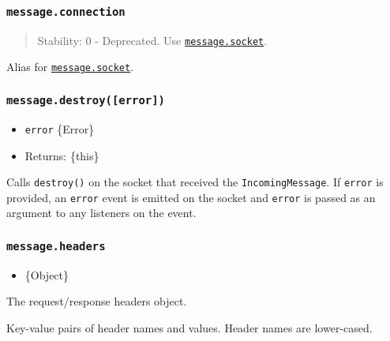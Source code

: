 \subsubsection{\texorpdfstring{\texttt{message.connection}}{message.connection}}\label{message.connection}

\begin{quote}
Stability: 0 - Deprecated. Use
\hyperref[messagesocket]{\texttt{message.socket}}.
\end{quote}

Alias for \hyperref[messagesocket]{\texttt{message.socket}}.

\subsubsection{\texorpdfstring{\texttt{message.destroy({[}error{]})}}{message.destroy({[}error{]})}}\label{message.destroyerror}

\begin{itemize}
\tightlist
\item
  \texttt{error} \{Error\}
\item
  Returns: \{this\}
\end{itemize}

Calls \texttt{destroy()} on the socket that received the
\texttt{IncomingMessage}. If \texttt{error} is provided, an
\texttt{\textquotesingle{}error\textquotesingle{}} event is emitted on
the socket and \texttt{error} is passed as an argument to any listeners
on the event.

\subsubsection{\texorpdfstring{\texttt{message.headers}}{message.headers}}\label{message.headers}

\begin{itemize}
\tightlist
\item
  \{Object\}
\end{itemize}

The request/response headers object.

Key-value pairs of header names and values. Header names are
lower-cased.

\begin{Shaded}
\begin{Highlighting}[]
\CommentTok{//}
\NormalTok{)}\OperatorTok{;}
\end{Highlighting}
\end{Shaded}

